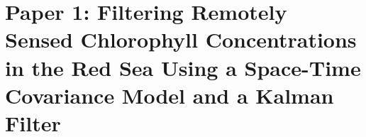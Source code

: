 \chapter{Paper 1: Filtering Remotely Sensed Chlorophyll Concentrations in the Red Sea Using a Space-Time Covariance Model and a Kalman Filter}
\label{appendixB}



